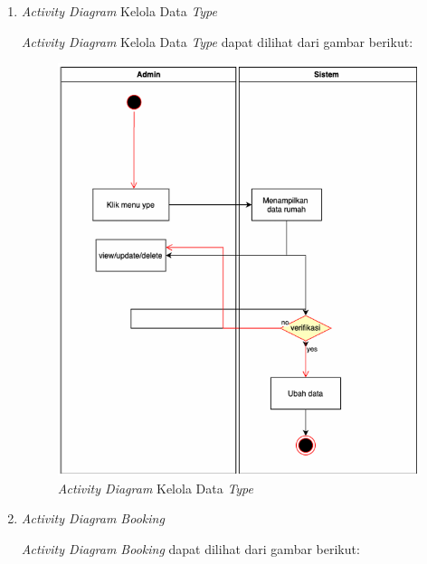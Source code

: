 \begin{enumerate}
    \item \textit{Activity Diagram} Kelola Data \textit{Type}
        \par \textit{Activity Diagram} Kelola Data \textit{Type} dapat dilihat dari gambar berikut:
            \begin{figure}
                \centering
                \includegraphics[width=0.95\linewidth]{uml/Activity Diagram - Kelola Type.png}
                \caption{\textit{Activity Diagram} Kelola Data \textit{Type}}
                \label{fig:enter-label}
            \end{figure}
    \item \textit{Activity Diagram Booking}
        \par \textit{Activity Diagram Booking} dapat dilihat dari gambar berikut:
            \begin{figure}
                \centering

\end{figure}
\end{enumerate}
